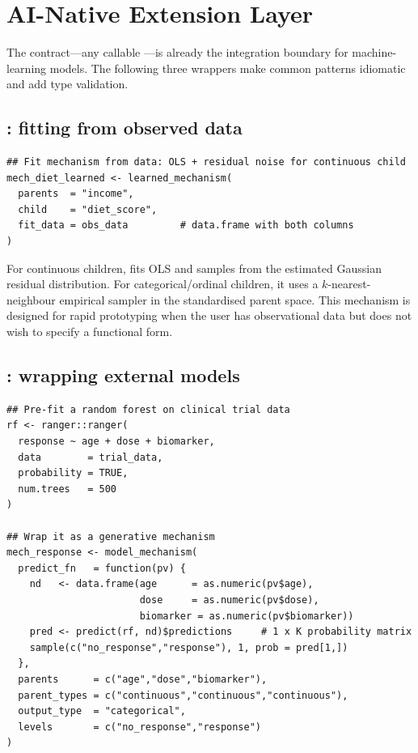 \documentclass[article]{jss}
\begin{document}
\section{AI-Native Extension Layer}
\label{sec:ai}

The  contract---any callable
---is already the integration boundary
for machine-learning models. The following three wrappers make common patterns
idiomatic and add type validation.

\subsection{: fitting from observed data}
\label{sec:learned}

\begin{tcolorbox}[codebox, title={\small\textbf{R} code}]
\begin{verbatim}
## Fit mechanism from data: OLS + residual noise for continuous child
mech_diet_learned <- learned_mechanism(
  parents  = "income",
  child    = "diet_score",
  fit_data = obs_data         # data.frame with both columns
)
\end{verbatim}
\end{tcolorbox}

For continuous children,  fits OLS and samples from the
estimated Gaussian residual distribution. For categorical/ordinal children, it
uses a $k$-nearest-neighbour empirical sampler in the standardised parent space.
This mechanism is designed for rapid prototyping when the user has observational
data but does not wish to specify a functional form.

\subsection{: wrapping external models}
\label{sec:model_mech}

\begin{tcolorbox}[codebox, title={\small\textbf{R} code --- ranger random forest as mechanism}]
\begin{verbatim}
## Pre-fit a random forest on clinical trial data
rf <- ranger::ranger(
  response ~ age + dose + biomarker,
  data        = trial_data,
  probability = TRUE,
  num.trees   = 500
)

## Wrap it as a generative mechanism
mech_response <- model_mechanism(
  predict_fn   = function(pv) {
    nd   <- data.frame(age      = as.numeric(pv$age),
                       dose     = as.numeric(pv$dose),
                       biomarker = as.numeric(pv$biomarker))
    pred <- predict(rf, nd)$predictions     # 1 x K probability matrix
    sample(c("no_response","response"), 1, prob = pred[1,])
  },
  parents      = c("age","dose","biomarker"),
  parent_types = c("continuous","continuous","continuous"),
  output_type  = "categorical",
  levels       = c("no_response","response")
)
\end{verbatim}
\end{tcolorbox}
\end{document}

